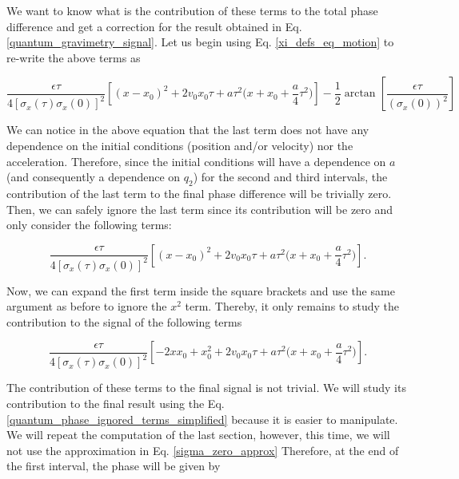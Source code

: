 \documentclass{article}
\begin{document}
We want to know what is the contribution of these terms to the total phase difference and get a correction for the result obtained in Eq. \ref{quantum_gravimetry_signal}. Let us begin using Eq. \ref{xi_defs_eq_motion} to re-write the above terms as 

\begin{equation}\label{quantum_phase_ignored_terms}
\frac{\epsilon \tau}{4 [\sigma_{x}(\tau)\sigma_{x}(0)]^{2}} \left[(x-x_{0})^{2} + 2v_{0} x_{0} \tau +a \tau^{2} \bigg(x+x_{0}+ \frac{a}{4} \tau^{2} \bigg)\right] 
- \frac{1}{2}\arctan\left[\frac{\epsilon \tau}{(\sigma_{x}(0))^{2}}\right]
\end{equation}

We can notice in the above equation that the last term does not have any dependence on the initial conditions (position and/or velocity) nor the acceleration. Therefore, since the initial conditions will have a dependence on $a$ (and consequently a dependence on $q_{2}$) for the second and third intervals, the contribution of the last term to the final phase difference will be trivially zero. Then, we can safely ignore the last term since its contribution will be zero and only consider the following terms:

\begin{equation}\label{quantum_phase_ignored_terms_simplified}
\frac{\epsilon \tau}{4 [\sigma_{x}(\tau)\sigma_{x}(0)]^{2}} \left[(x-x_{0})^{2} + 2v_{0} x_{0} \tau +a \tau^{2} \bigg(x+x_{0}+ \frac{a}{4} \tau^{2} \bigg)\right].
\end{equation}

Now, we can expand the first term inside the square brackets and use the same argument as before to ignore the $x^{2}$ term. Thereby, it only remains to study the contribution to the signal of the following terms

\begin{equation}\label{quantum_phase_ignored_terms_simplified_expanded}
\frac{\epsilon \tau}{4 [\sigma_{x}(\tau)\sigma_{x}(0)]^{2}} \left[-2x x_{0}+x_{0}^{2} + 2v_{0} x_{0} \tau +a \tau^{2} \bigg(x+x_{0}+ \frac{a}{4} \tau^{2} \bigg)\right].
\end{equation}

The contribution of these terms to the final signal is not trivial. We will study its contribution to the final result using the Eq. \ref{quantum_phase_ignored_terms_simplified}  because it is easier to manipulate. We will repeat the computation of the last section, however, this time, we will not use the approximation in Eq. \ref{sigma_zero_approx} Therefore, at the end of the first interval, the phase will be given by
\end{document}
